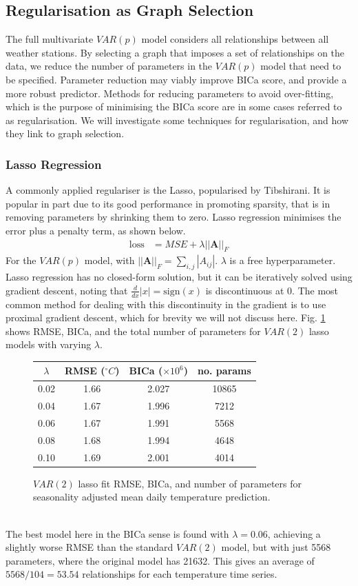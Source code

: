 \documentclass[12pt,a4paper]{article} %
\begin{document}
\subsection{Regularisation as Graph Selection}
The full multivariate $VAR(p)$ model considers all relationships between all weather stations. By selecting a graph that imposes a set of relationships on the data, we reduce the number of parameters in the $VAR(p)$ model that need to be specified. Parameter reduction may viably improve BICa score, and provide a more robust predictor. Methods for reducing parameters to avoid over-fitting, which is the purpose of minimising the BICa score are in some cases referred to as regularisation. We will investigate some techniques for regularisation, and how they link to graph selection.
\subsubsection{Lasso Regression}
A commonly applied regulariser is the Lasso, popularised by Tibshirani\cite{tibshirani}. It is popular in part due to its good performance in promoting sparsity, that is in removing parameters by shrinking them to zero. Lasso regression minimises the error plus a penalty term, as shown below.
\begin{align*}
    \text{loss}&=MSE+\lambda||\pmb{A}||_F
\end{align*}
For the $VAR(p)$ model, with $||\pmb{A}||_F=\sum_{i,j}|A_{ij}|$. $\lambda$ is a free hyperparameter. Lasso regression has no closed-form solution, but it can be iteratively solved using gradient descent, noting that $\frac {d}{dx}|x|=\text{sign}(x)$ is discontinuous at 0. The most common method for dealing with this discontinuity in the gradient is to use proximal gradient descent, which for brevity we will not discuss here. Fig. \ref{fig:lasso} shows RMSE, BICa, and the total number of parameters for $VAR(2)$ lasso models with varying $\lambda$.
\begin{figure}[!ht]
    \centering
    \begin{tabular}{|c|c|c|c|}
        \hline
        $\lambda$ & RMSE ($^\circ C$) & BICa ($\times10^6$) & no. params \\
        \hline
        0.02 & 1.66 & 2.027 & 10865 \\
        \hline
        0.04 & 1.67 & 1.996 & 7212 \\
        \hline
        0.06 & 1.67 & 1.991 & 5568 \\
        \hline
        0.08 & 1.68 & 1.994 & 4648 \\
        \hline
        0.10 & 1.69 & 2.001 & 4014 \\
        \hline
    \end{tabular}
    \caption{$VAR(2)$ lasso fit RMSE, BICa, and number of parameters for seasonality adjusted mean daily temperature prediction.}
    \label{fig:lasso}
\end{figure}
\\The best model here in the BICa sense is found with $\lambda=0.06$, achieving a slightly worse RMSE than the standard $VAR(2)$ model, but with just 5568 parameters, where the original model has 21632. This gives an average of $5568/104=53.54$ relationships for each temperature time series.
\end{document}
